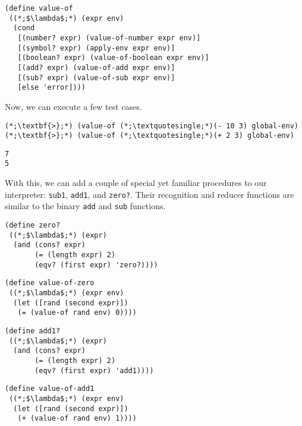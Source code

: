 \begin{cl}[]{}\begin{lstlisting}[language=MyScheme]
(define value-of
 ((*;$\lambda$;*) (expr env)
  (cond
   [(number? expr) (value-of-number expr env)]
   [(symbol? expr) (apply-env expr env)]
   [(boolean? expr) (value-of-boolean expr env)]
   [(add? expr) (value-of-add expr env)]
   [(sub? expr) (value-of-sub expr env)]
   [else 'error])))
\end{lstlisting}\end{cl}

\noindent Now, we can execute a few test cases.

\begin{cloast}[]{}
\begin{lstlisting}[language=MyScheme]
(*;\textbf{>};*) (value-of (*;\textquotesingle;*)(- 10 3) global-env)
(*;\textbf{>};*) (value-of (*;\textquotesingle;*)(+ 2 3) global-env)
\end{lstlisting}
\tcblower
\begin{lstlisting}[language=MyOutput]
7
5
\end{lstlisting}
\end{cloast}

With this, we can add a couple of special yet familiar procedures to our interpreter: \texttt{sub1}, \texttt{add1}, and \texttt{zero?}. Their recognition and reducer functions are similar to the binary \texttt{add} and \texttt{sub} functions.

\begin{clrr}[]{}
\begin{lstlisting}[language=MyScheme]
(define zero?
 ((*;$\lambda$;*) (expr)
  (and (cons? expr)
       (= (length expr) 2)
       (eqv? (first expr) 'zero?))))
\end{lstlisting}
\tcblower
\begin{lstlisting}[language=MyNLNScheme]
(define value-of-zero
 ((*;$\lambda$;*) (expr env)
  (let ([rand (second expr)])
   (= (value-of rand env) 0))))
\end{lstlisting}
\end{clrr}

\begin{clrr}[]{}
\begin{lstlisting}[language=MyScheme]
(define add1?
 ((*;$\lambda$;*) (expr)
  (and (cons? expr)
       (= (length expr) 2)
       (eqv? (first expr) 'add1))))
\end{lstlisting}
\tcblower
\begin{lstlisting}[language=MyNLNScheme]
(define value-of-add1
 ((*;$\lambda$;*) (expr env)
  (let ([rand (second expr)])
   (+ (value-of rand env) 1))))
\end{lstlisting}
\end{clrr}

